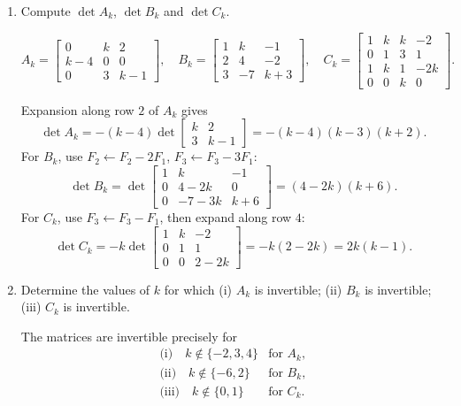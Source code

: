 \begin{enumerate}[label=\alph*)]

\item Compute $\det A_k$, $\det B_k$ and $\det C_k$.

\begin{answer}
\[
 A_k=\begin{bmatrix}0&k&2\\k-4&0&0\\0&3&k-1\end{bmatrix},\quad
 B_k=\begin{bmatrix}1&k&-1\\2&4&-2\\3&-7&k+3\end{bmatrix},\quad
 C_k=\begin{bmatrix}1&k&k&-2\\0&1&3&1\\1&k&1&-2k\\0&0&k&0\end{bmatrix}.
\]

Expansion along row $2$ of $A_k$ gives
\[
 \det A_k=-(k-4)\det\begin{bmatrix}k&2\\3&k-1\end{bmatrix}
 =-(k-4)(k-3)(k+2).
\]
For $B_k$, use $F_2\gets F_2-2F_1$, $F_3\gets F_3-3F_1$:
\[
 \det B_k=\det\begin{bmatrix}1&k&-1\\0&4-2k&0\\0&-7-3k&k+6\end{bmatrix}
 =(4-2k)(k+6).
\]
For $C_k$, use $F_3\gets F_3-F_1$, then expand along row $4$:
\[
 \det C_k=-k\det\begin{bmatrix}1&k&-2\\0&1&1\\0&0&2-2k\end{bmatrix}
 =-k(2-2k)=2k(k-1).
\]
\end{answer}

\item Determine the values of $k$ for which (i) $A_k$ is invertible; (ii) $B_k$ is invertible; (iii) $C_k$ is invertible.

\begin{answer}
The matrices are invertible precisely for
\[
 \begin{array}{ll}
 \text{(i)}\quad k\notin\{-2,3,4\}&\text{for }A_k,\\
 \text{(ii)}\quad k\notin\{-6,2\}&\text{for }B_k,\\
 \text{(iii)}\quad k\notin\{0,1\}&\text{for }C_k.
 \end{array}
\]
\end{answer}


\end{enumerate}
